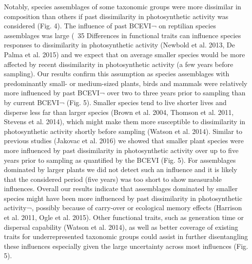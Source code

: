 {	Notably, species assemblages of some taxonomic groups were more dissimilar in composition than others if past dissimilarity in photosynthetic activity was considered (Fig. 4). The influence of past BCEVI¬ on reptilian species assemblages was large (~35 %
	Differences in functional traits can influence species responses to dissimilarity in photosynthetic activity (Newbold et al. 2013, De Palma et al. 2015) and we expect that on average smaller species would be more affected by recent dissimilarity in photosynthetic activity (a few years before sampling). Our results confirm this assumption as species assemblages with predominantly small- or medium-sized plants, birds and mammals were relatively more influenced by past BCEVI¬ over two to three years prior to sampling than by current BCEVI¬ (Fig. 5). Smaller species tend to live shorter lives and disperse less far than larger species (Brown et al. 2004, Thomson et al. 2011, Stevens et al. 2014), which might make them more susceptible to dissimilarity in photosynthetic activity shortly before sampling (Watson et al. 2014). Similar to previous studies (Jakovac et al. 2016) we showed that smaller plant species were more influenced by past dissimilarity in photosynthetic activity over up to five years prior to sampling as quantified by the BCEVI (Fig. 5). For assemblages dominated by larger plants we did not detect such an influence and it is likely that the considered period (five years) was too short to show measurable influences. Overall our results indicate that assemblages dominated by smaller species might have been more influenced by past dissimilarity in photosynthetic activity¬,  possibly because of carry-over or ecological memory effects (Harrison et al. 2011, Ogle et al. 2015). Other functional traits, such as generation time or dispersal capability (Watson et al. 2014), as well as better coverage of existing traits for underrepresented taxonomic groups could assist in further disentangling these influences especially given the large uncertainty across most influences (Fig. 5). 
}
